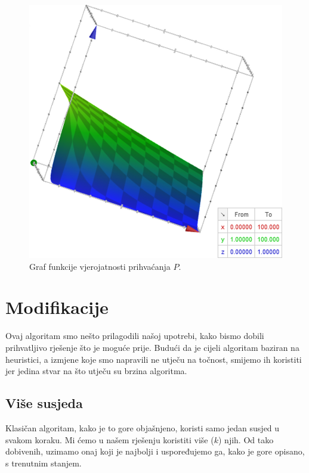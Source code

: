 \documentclass[times, utf8, zavrsni]{fer}
\begin{document}
\begin{figure}
\centering
\includegraphics[scale=0.8]{res/P_graf_de(0_100)_t(1,100).PNG}
\caption[Graf funkcije $P$]{Graf funkcije vjerojatnosti prihvaćanja $P$.}
\label{figure:vjerojatnost}
\end{figure}

\section{Modifikacije}

Ovaj algoritam smo nešto prilagodili našoj upotrebi, kako bismo dobili
prihvatljivo rješenje što je moguće prije. Budući da je cijeli
algoritam baziran na heuristici, a izmjene koje smo napravili
ne utječu na točnost, smijemo ih koristiti jer jedina stvar
na što utječu su brzina algoritma. 

\subsection{Više susjeda}
Klasičan algoritam, kako je to gore objašnjeno, koristi samo jedan susjed u svakom
koraku. Mi ćemo u našem rješenju koristiti više ($k$) njih. Od tako dobivenih,
uzimamo onaj koji je najbolji i uspoređujemo ga, kako je gore opisano,
s trenutnim stanjem. 
\end{document}
